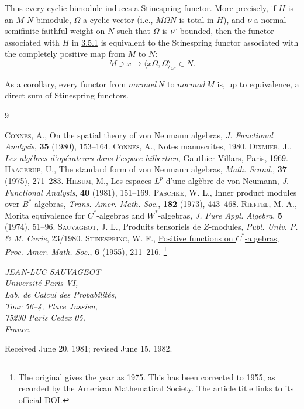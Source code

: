 \documentclass[fontsize=13pt,twoside,headings=small,bookmarkpackage=false]{scrartcl}
\newcounter{translatornote}
\newcommand{\tfnote}[1]{\stepcounter{translatornote}\begingroup
  \renewcommand{\thefootnote}{T\arabic{translatornote}}\footnote{#1}\endgroup}
\begin{document}
Thus every cyclic bimodule induces a Stinespring functor. More precisely, if $H$ is an $M$-$N$ bimodule, $\Omega$ a cyclic vector (i.e., $M\Omega N$ is total in $H$), and $\nu$ a normal semifinite faithful weight on $N$ such that $\Omega$ is $\nu^\circ$-bounded, then the functor associated with $H$ in \hyperref[p:3.5.1]{3.5.1} is equivalent to the Stinespring functor associated with the completely positive map from $M$ to $N$:
\[
M\ni x\longmapsto\langle x\Omega,\Omega\rangle_{\nu^\circ}\in N.
\]

As a corollary, every functor from $\mathit{normod}\,N$ to $\mathit{normod}\,M$ is, up to equivalence, a direct sum of Stinespring functors.

\begin{thebibliography}{9}
\label{sec:references}
 \textsc{Connes, A.}, On the spatial theory of von Neumann algebras, \emph{J. Functional Analysis}, \textbf{35} (1980), 153--164.
 \textsc{Connes, A.}, Notes manuscrites, 1980.
 \textsc{Dixmier, J.}, \emph{Les alg\`ebres d'op\'erateurs dans l'espace hilbertien}, Gauthier-Villars, Paris, 1969.
 \textsc{Haagerup, U.}, The standard form of von Neumann algebras, \emph{Math. Scand.}, \textbf{37} (1975), 271--283.
 \textsc{Hilsum, M.}, Les espaces $L^p$ d'une alg\`ebre de von Neumann, \emph{J. Functional Analysis}, \textbf{40} (1981), 151--169.
 \textsc{Paschke, W. L.}, Inner product modules over $B^*$-algebras, \emph{Trans. Amer. Math. Soc.}, \textbf{182} (1973), 443--468.
 \textsc{Rieffel, M. A.}, Morita equivalence for $C^*$-algebras and $W^*$-algebras, \emph{J. Pure Appl. Algebra}, \textbf{5} (1974), 51--96.
 \textsc{Sauvageot, J. L.}, Produits tensoriels de $Z$-modules, \emph{Publ. Univ. P. \& M. Curie}, 23/1980.
 \textsc{Stinespring, W. F.}, \href{https://doi.org/10.1090/S0002-9939-1955-0069403-4}{Positive functions on $C^*$-algebras}, \emph{Proc. Amer. Math. Soc.}, \textbf{6} (1955), 211--216.\tfnote{The original gives the year as 1975. This has been corrected to 1955, as recorded by the American Mathematical Society. The article title links to its official DOI.}
\end{thebibliography}

\begin{flushright}
\textit{JEAN-LUC SAUVAGEOT}\\
\textit{Universit\'e Paris VI,}\\
\textit{Lab. de Calcul des Probabilit\'es,}\\
\textit{Tour 56--4, Place Jussieu,}\\
\textit{75230 Paris Cedex 05,}\\
\textit{France.}
\end{flushright}

\begin{center}
Received June 20, 1981; revised June 15, 1982.
\end{center}
\end{document}
